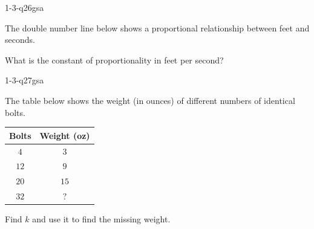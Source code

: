 \begin{practiceQuestion}{1-3-q26}{gsa}
\begin{questionText}
The double number line below shows a proportional relationship between feet and seconds.

\begin{center}
\end{center}

What is the constant of proportionality in feet per second?
\end{questionText}
\end{practiceQuestion}

\begin{practiceQuestion}{1-3-q27}{gsa}
\begin{questionText}
The table below shows the weight (in ounces) of different numbers of identical bolts.

\begin{center}
\begin{tabular}{|c|c|}
\hline
\textbf{Bolts} & \textbf{Weight (oz)} \\
\hline
$4$ & $3$ \\
$12$ & $9$ \\
$20$ & $15$ \\
$32$ & $?$ \\
\hline
\end{tabular}
\end{center}

Find $k$ and use it to find the missing weight.
\end{questionText}
\end{practiceQuestion}
